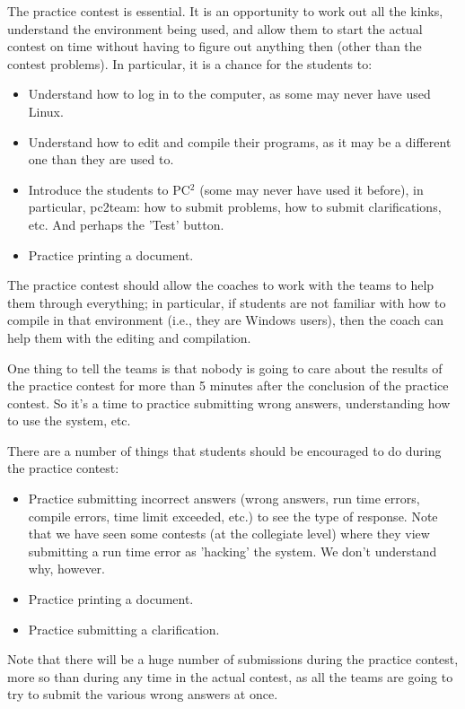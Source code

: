 \documentclass[11pt,twoside,letterpaper]{book}
\newenvironment{itemlist}{
\begin{itemize}
\setlength{\itemsep}{0pt}
\setlength{\parskip}{0pt}}
{\end{itemize}}
\begin{document}
The practice contest is essential.  It is an opportunity to work out
all the kinks, understand the environment being used, and allow them
to start the actual contest on time without having to figure out
anything then (other than the contest problems).  In particular, it is
a chance for the students to:

\begin{itemlist}
\item Understand how to log in to the computer, as some may never have
used Linux.
\item Understand how to edit and compile their programs, as it may be
a different one than they are used to.
\item Introduce the students to PC$^2$ (some may never have used it
before), in particular, pc2team: how to submit problems, how to submit
clarifications, etc.  And perhaps the 'Test' button.
\item Practice printing a document.
\end{itemlist}

The practice contest should allow the coaches to work with the teams
to help them through everything; in particular, if students are not
familiar with how to compile in that environment (i.e., they are
Windows users), then the coach can help them with the editing and
compilation.

One thing to tell the teams is that nobody is going to care about the
results of the practice contest for more than 5 minutes after the
conclusion of the practice contest.  So it's a time to practice
submitting wrong answers, understanding how to use the system, etc.

There are a number of things that students should be encouraged to do
during the practice contest:

\begin{itemlist}
\item Practice submitting incorrect answers (wrong answers, run time
errors, compile errors, time limit exceeded, etc.) to see the type of
response.  Note that we have seen some contests (at the collegiate
level) where they view submitting a run time error as 'hacking' the
system.  We don't understand why, however.
\item Practice printing a document.
\item Practice submitting a clarification.
\end{itemlist}

Note that there will be a huge number of submissions during the
practice contest, more so than during any time in the actual contest,
as all the teams are going to try to submit the various wrong answers
at once.
\end{document}
